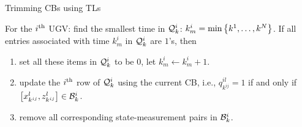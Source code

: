 	
	\begin{algorithm}
		\caption{Trimming CBs using TLs}
		\label{alg:tracklist}
		\begin{algorithmic}
			\State 
			For the $i^\text{th}$ UGV:			
			find the smallest time in $\mathcal{Q}^i_k$: $k^i_m=\min\left\lbrace k^{1},\dots,k^{N} \right\rbrace$. 			
			If all entries associated with time $k^i_m$ in $\mathcal{Q}^i_k$ are $1$'s, then 
			\begin{enumerate}
				\item set all these items in $\mathcal{Q}^i_k$ to be $0$, let $k^i_m \leftarrow k^i_m+1.$
				\item update the $i^\text{th}$ row of $\mathcal{Q}^i_k$ using the current CB, i.e., $q^{il}_{k^{ij}}=1$ if and only if $\left[x^l_{k^{ij}},z^l_{k^{ij}}\right]\in \mathcal{B}^i_k$.
				\item remove all corresponding state-measurement pairs in $\mathcal{B}^i_k$.
			\end{enumerate}				
		\end{algorithmic}
	\end{algorithm}
	
